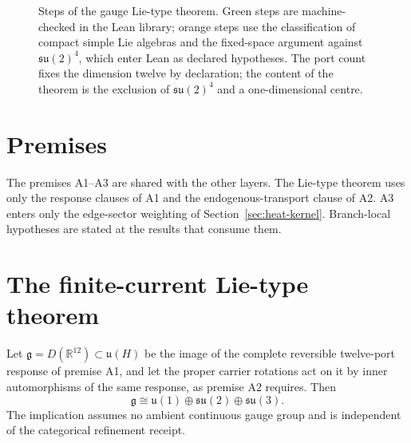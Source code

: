 \documentclass[11pt]{article}
\begin{document}
\begin{figure}[!htb]
\centering

\caption{Steps of the gauge Lie-type theorem. Green steps are machine-checked in the Lean library; orange steps use the classification of compact simple Lie algebras and the fixed-space argument against $\mathfrak{su}(2)^4$, which enter Lean as declared hypotheses. The port count fixes the dimension twelve by declaration; the content of the theorem is the exclusion of $\mathfrak{su}(2)^4$ and a one-dimensional centre.}
\label{fig:gauge-lie-type}
\end{figure}

\section{Premises}
\label{sec:gauge-premises}

The premises A1--A3 are shared with the other layers. The Lie-type theorem
uses only the response clauses of A1 and the endogenous-transport clause of
A2. A3 enters only the edge-sector weighting of
Section~\ref{sec:heat-kernel}. Branch-local hypotheses are stated at the
results that consume them.



\section{The finite-current Lie-type theorem}
\label{sec:lie-type}

\begin{theorem}
\label{thm:current-algebra}\label{thm:finite-current-fixed-space}
Let \(\mathfrak g=D(\mathbb R^{12})\subset\mathfrak u(H)\) be the image of
the complete reversible twelve-port response of premise A1, and let the
proper carrier rotations act on it by inner automorphisms of the same
response, as premise A2 requires. Then
\[
\mathfrak g\cong
\mathfrak u(1)\oplus\mathfrak{su}(2)\oplus\mathfrak{su}(3).
\]
The implication assumes no ambient continuous gauge group and is
independent of the categorical refinement receipt.
\end{theorem}
\end{document}

